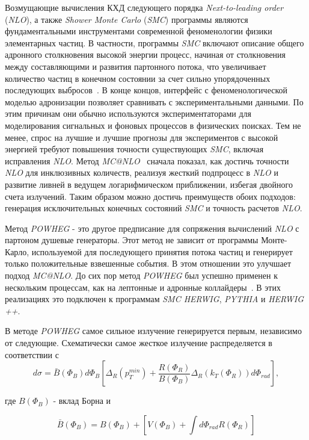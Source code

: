 Возмущающие вычисления КХД следующего порядка \textit{Next-to-leading order} (\textit{NLO}), а также \textit{Shower Monte Carlo}
(\textit{SMC}) программы являются фундаментальными инструментами современной феноменологии физики элементарных частиц. В частности, программы \textit{SMC} включают описание общего адронного столкновения высокой энергии
процесс, начиная от столкновения между составляющими и развития партонного потока, что
увеличивает количество частиц в конечном состоянии за счет сильно упорядоченных последующих выбросов~\cite{review-powheg}.
В конце концов, интерфейс с феноменологической моделью адронизации позволяет сравнивать
с экспериментальными данными. По этим причинам они обычно используются экспериментаторами для
моделирования сигнальных и фоновых процессов в физических поисках. Тем не менее, спрос на
лучшие и лучшие прогнозы для экспериментов с высокой энергией требуют повышения точности
существующих \textit{SMC}, включая исправления \textit{NLO}. Метод \textit{MC@NLO}~\cite{review-powheg} сначала показал, как
достичь точности \textit{NLO} для инклюзивных количеств, реализуя жесткий подпроцесс в \textit{NLO} и
развитие ливней в ведущем логарифмическом приближении, избегая двойного счета
излучений. Таким образом можно достичь преимуществ обоих подходов: генерация исключительных конечных состояний
\textit{SMC} и точность расчетов \textit{NLO}.

Метод \textit{POWHEG} - это другое предписание для сопряжения вычислений \textit{NLO} с партоном
душевые генераторы.
Этот метод не зависит от программы Монте-Карло, используемой для последующего принятия потока частиц и
генерирует только положительные взвешенные события. В этом отношении это улучшает подход \textit{MC@NLO}.
До сих пор метод \textit{POWHEG} был успешно применен к нескольким процессам, как на
лептонные и адронные коллайдеры~\cite{review-powheg}. В этих реализациях это
подключен к программам \textit{SMC HERWIG}, \textit{PYTHIA} и \textit{HERWIG ++}.

В методе \textit{POWHEG} самое сильное излучение
генерируется первым, независимо от
следующие. Схематически
самое жесткое излучение распределяется в соответствии с
\[ 
	d\sigma = \bar{B} ({\Phi}_{B}) d{\Phi}_{B}[{\Delta}_{R}({p}_{T}^{min}) + \frac{R({\Phi}_{R})}{B({\Phi}_{B})}{\Delta}_{R}({k}_{T}({\Phi}_{R}))d{\Phi}_{rad}],
\]

где $B({\Phi}_{B})$ - вклад Борна и

\[ 
	\bar{B}({\Phi}_{B}) = B({\Phi}_{B}) + [V({\Phi}_{B}) + \int d{\Phi}_{rad}R({\Phi}_{R})]
\]

